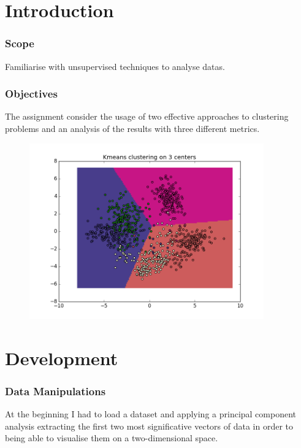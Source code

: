 \documentclass{article}
\begin{document}
			\renewcommand{\lstlistingname}{Code}

			
			\part{Introduction}
			
				\section{Scope}
Familiarise with unsupervised techniques to analyse datas.
				\section{Objectives}
				The assignment consider the usage of two effective approaches to clustering problems and an analysis of the results with three different metrics.
				\begin{center}
\begin{figure}
\centering
\includegraphics[width=0.9\textwidth]{figure_1}
\caption{}
\label{fig:1}
\end{figure}
\end{center}

\newpage
			\part{Development}
				\section{Data Manipulations}
	
	At the beginning I had to load a dataset and applying a principal component analysis extracting the first two most significative vectors of data in order to being able to visualise them on a two-dimensional space.
	
\end{document}
